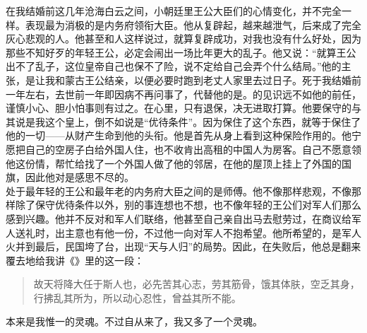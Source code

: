 在我结婚前这几年沧海白云之间，小朝廷里王公大臣们的心情变化，并不完全一样。表现最为消极的是内务府领衔大臣。他从复辟起，越来越泄气，后来成了完全灰心悲观的人。他甚至和人这样说过，就算复辟成功，对我也没有什么好处，因为那些不知好歹的年轻王公，必定会闹出一场比年更大的乱子。他又说：“就算王公出不了乱子，这位皇帝自己也保不了险，说不定给自己会弄个什么结局。”他的主张，是让我和蒙古王公结亲，以便必要时跑到老丈人家里去过日子。死于我结婚前一年左右，去世前一年即因病不再问事了，代替他的是。的见识远不如他的前任，谨慎小心、胆小怕事则有过之。在心里，只有退保，决无进取打算。他要保守的与其说是我这个皇上，倒不如说是“优待条件”。因为保住了这个东西，就等于保住了他的一切——从财产生命到他的头衔。他是首先从身上看到这种保险作用的。他宁愿把自己的空房子白给外国人住，也不收肯出高租的中国人为房客。自己不愿意领他这份情，帮忙给找了一个外国人做了他的邻居，在他的屋顶上挂上了外国的国旗，因此他对是感思不尽的。\\

处于最年轻的王公和最年老的内务府大臣之间的是师傅。他不像那样悲观，不像那样除了保守优待条件以外，别的事连想也不想，也不像年轻的王公们对军人们那么感到兴趣。他并不反对和军人们联络，他甚至自己亲自出马去慰劳过，在商议给军人送礼时，出主意也有他一份，不过他一向对军人不抱希望。他所希望的，是军人火并到最后，民国垮了台，出现“天与人归”的局势。因此，在失败后，他总是翻来覆去地给我讲《》里的这一段：\\

\begin{quote}
	故天将降大任于斯人也，必先苦其心志，劳其筋骨，饿其体肤，空乏其身，行拂乱其所为，所以动心忍性，曾益其所不能。\\
\end{quote}

本来是我惟一的灵魂。不过自从来了，我又多了一个灵魂。
